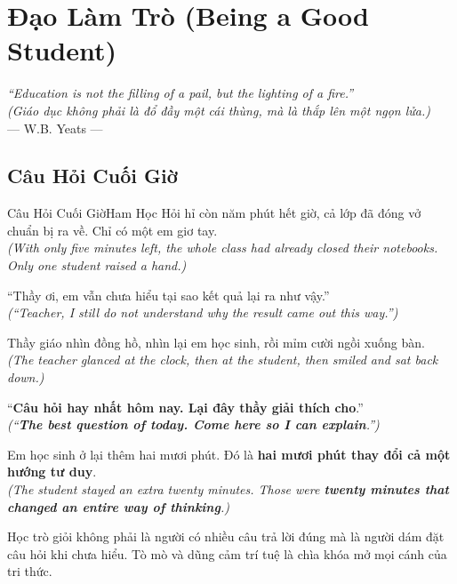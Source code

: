 \chapter{Đạo Làm Trò (Being a Good Student)}

\begin{center}
  \textit{\color{truyenblue}``Education is not the filling of a pail, but the lighting of a fire.''}\\
  \textit{(Giáo dục không phải là đổ đầy một cái thùng, mà là thắp lên một ngọn lửa.)}\\[4pt]
  \small\color{truyengold}--- W.B. Yeats ---
\end{center}
\ngancach

\section{Câu Hỏi Cuối Giờ}
\begin{truyen}{Câu Hỏi Cuối Giờ}{Ham Học Hỏi}
hỉ còn năm phút hết giờ, cả lớp đã đóng vở chuẩn bị ra về. Chỉ có một em giơ tay.\\
\textit{(With only five minutes left, the whole class had already closed their notebooks. Only one student raised a hand.)}

``Thầy ơi, em vẫn chưa hiểu tại sao kết quả lại ra như vậy.''\\
\textit{(``Teacher, I still do not understand why the result came out this way.'')}

Thầy giáo nhìn đồng hồ, nhìn lại em học sinh, rồi mỉm cười ngồi xuống bàn.\\
\textit{(The teacher glanced at the clock, then at the student, then smiled and sat back down.)}

``\textbf{Câu hỏi hay nhất hôm nay. Lại đây thầy giải thích cho}.''\\
\textit{(``\textbf{The best question of today. Come here so I can explain}.'')}

Em học sinh ở lại thêm hai mươi phút. Đó là \textbf{hai mươi phút thay đổi cả một hướng tư duy}.\\
\textit{(The student stayed an extra twenty minutes. Those were \textbf{twenty minutes that changed an entire way of thinking}.)}
\end{truyen}
\begin{baihoc}
  Học trò giỏi không phải là người có nhiều câu trả lời đúng mà là người dám đặt câu hỏi khi chưa hiểu. Tò mò và dũng cảm trí tuệ là chìa khóa mở mọi cánh của tri thức.
\end{baihoc}

